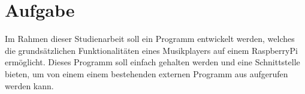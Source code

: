 \section{Aufgabe}
Im Rahmen dieser Studienarbeit soll ein Programm entwickelt werden, welches
die grundsätzlichen Funktionalitäten eines Musikplayers auf einem RaspberryPi
ermöglicht. Dieses Programm soll einfach gehalten werden und eine Schnittstelle
bieten, um von einem einem bestehenden externen Programm aus aufgerufen werden
kann. 
